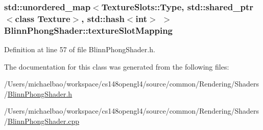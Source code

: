 \subsubsection[{texture\+Slot\+Mapping}]{\setlength{\rightskip}{0pt plus 5cm}std\+::unordered\+\_\+map$<${\bf Texture\+Slots\+::\+Type}, std\+::shared\+\_\+ptr$<$class {\bf Texture}$>$, std\+::hash$<$int$>$ $>$ Blinn\+Phong\+Shader\+::texture\+Slot\+Mapping\hspace{0.3cm}{\ttfamily [private]}}\label{class_blinn_phong_shader_a7467b1de2650fd04ea63ed5f8aeedc59}


Definition at line 57 of file Blinn\+Phong\+Shader.\+h.



The documentation for this class was generated from the following files\+:\begin{DoxyCompactItemize}
\item 
/\+Users/michaelbao/workspace/cs148opengl4/source/common/\+Rendering/\+Shaders/\hyperlink{_blinn_phong_shader_8h}{Blinn\+Phong\+Shader.\+h}\item 
/\+Users/michaelbao/workspace/cs148opengl4/source/common/\+Rendering/\+Shaders/\hyperlink{_blinn_phong_shader_8cpp}{Blinn\+Phong\+Shader.\+cpp}\end{DoxyCompactItemize}

